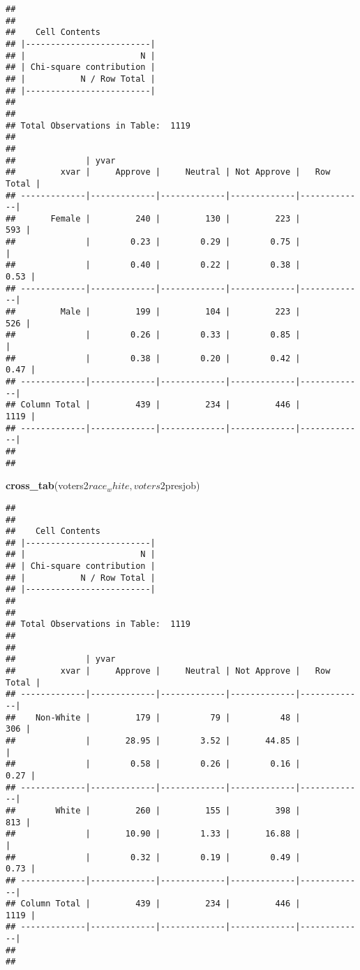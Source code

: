 \documentclass[]{article}
\newenvironment{Shaded}{\begin{snugshade}}{\end{snugshade}}
\newcommand{\KeywordTok}[1]{\textcolor[rgb]{0.13,0.29,0.53}{\textbf{{#1}}}}
\newcommand{\NormalTok}[1]{{#1}}
\begin{document}
\begin{verbatim}
## 
##  
##    Cell Contents
## |-------------------------|
## |                       N |
## | Chi-square contribution |
## |           N / Row Total |
## |-------------------------|
## 
##  
## Total Observations in Table:  1119 
## 
##  
##              | yvar 
##         xvar |     Approve |     Neutral | Not Approve |   Row Total | 
## -------------|-------------|-------------|-------------|-------------|
##       Female |         240 |         130 |         223 |         593 | 
##              |        0.23 |        0.29 |        0.75 |             | 
##              |        0.40 |        0.22 |        0.38 |        0.53 | 
## -------------|-------------|-------------|-------------|-------------|
##         Male |         199 |         104 |         223 |         526 | 
##              |        0.26 |        0.33 |        0.85 |             | 
##              |        0.38 |        0.20 |        0.42 |        0.47 | 
## -------------|-------------|-------------|-------------|-------------|
## Column Total |         439 |         234 |         446 |        1119 | 
## -------------|-------------|-------------|-------------|-------------|
## 
## 
\end{verbatim}

\begin{Shaded}
\begin{Highlighting}[]
\KeywordTok{cross_tab}\NormalTok{(voters2$race_white, voters2$presjob)}
\end{Highlighting}
\end{Shaded}

\begin{verbatim}
## 
##  
##    Cell Contents
## |-------------------------|
## |                       N |
## | Chi-square contribution |
## |           N / Row Total |
## |-------------------------|
## 
##  
## Total Observations in Table:  1119 
## 
##  
##              | yvar 
##         xvar |     Approve |     Neutral | Not Approve |   Row Total | 
## -------------|-------------|-------------|-------------|-------------|
##    Non-White |         179 |          79 |          48 |         306 | 
##              |       28.95 |        3.52 |       44.85 |             | 
##              |        0.58 |        0.26 |        0.16 |        0.27 | 
## -------------|-------------|-------------|-------------|-------------|
##        White |         260 |         155 |         398 |         813 | 
##              |       10.90 |        1.33 |       16.88 |             | 
##              |        0.32 |        0.19 |        0.49 |        0.73 | 
## -------------|-------------|-------------|-------------|-------------|
## Column Total |         439 |         234 |         446 |        1119 | 
## -------------|-------------|-------------|-------------|-------------|
## 
## 
\end{verbatim}
\end{document}
